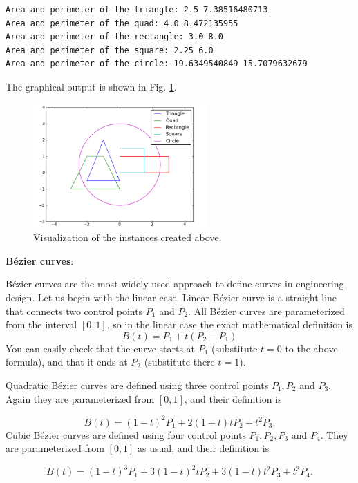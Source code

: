 \documentclass[article,A4,12pt]{llncs}
\begin{document}
\begin{verbatim}
Area and perimeter of the triangle: 2.5 7.38516480713
Area and perimeter of the quad: 4.0 8.472135955
Area and perimeter of the rectangle: 3.0 8.0
Area and perimeter of the square: 2.25 6.0
Area and perimeter of the circle: 19.6349540849 15.7079632679
\end{verbatim}
The graphical output is shown in Fig. \ref{fig:classes2}.

\begin{figure}[!ht]
\begin{center}
\includegraphics[width=0.6\textwidth]{img/classes2.png}
\end{center}
\vspace{-2mm}
\caption{Visualization of the instances created above.}
\label{fig:classes2}
\end{figure}

\noindent
{\bf B\'ezier curves}: 

B\'ezier curves are the most widely used approach to define curves in engineering design. 
Let us begin with the linear case. Linear B\'ezier curve is a straight line that
connects two control points $P_1$ and $P_2$. All B\'ezier curves are parameterized
from the interval $[0, 1]$, so in the linear case the exact mathematical definition is
$$
  B(t) = P_1 + t(P_2 - P_1)
$$ 
You can easily check that the curve starts at $P_1$ (substitute $t = 0$ to the above formula),
and that it ends at $P_2$ (substitute there $t = 1$).

Quadratic B\'ezier curves are defined using three control points $P_1, P_2$ and $P_3$. Again they are
parameterized from $[0, 1]$, and their definition is

$$
  B(t) = (1 - t)^2 P_1 + 2(1 - t)t P_2 + t^2 P_3.
$$ 
Cubic B\'ezier curves are defined using four control points $P_1, P_2, P_3$ and $P_4$. They are
parameterized from $[0, 1]$ as usual, and their definition is

$$
  B(t) = (1 - t)^3 P_1 + 3(1 - t)^2t P_2 + 3(1-t)t^2 P_3 + t^3 P_4.
$$ 
\end{document}
